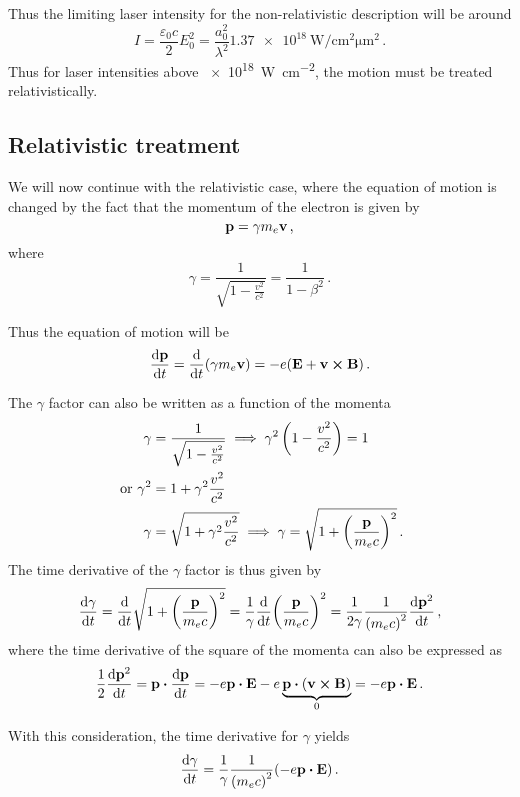 \documentclass[12pt, class=report, crop=false]{standalone}
\begin{document}
Thus the limiting laser intensity for the non-relativistic description will be around
\[
I = \frac{\varepsilon_0 c}{2} E_0^2 =
\frac{a_0^2}{\lambda^2} \SI{1.37e18}{\watt\per\centi\metre\squared\micro\metre\squared}\,.
\]
Thus for laser intensities above \SI{e18}{\watt\per\centi\metre\squared},
the motion must be treated relativistically.

\subsection{Relativistic treatment}

We will now continue with the relativistic case, where the equation
of motion is changed by the fact that the momentum of the electron is given by
\[
\vb{p} = \gamma m_e \vb{v}\,,
\]
where
\[
\gamma = \frac{1}{\sqrt{1-\frac{v^2}{c^2}}} = \frac{1}{1-\beta^2}\,.
\]

Thus the equation of motion will be
\begin{equation}
  \label{eq:relativistic-lorentz}
  \dv{\vb{p}}{t} = \dv{t}(\gamma m_e \vb{v}) = -e (\vb{E} + \vb{v}\cp\vb{B})\,.
\end{equation}

The \(\gamma\) factor can also be written as a function of the momenta
\[
\begin{aligned}
  \gamma &= \frac{1}{\sqrt{1-\frac{v^2}{c^2}}} \implies
  \gamma^2\left(1-\frac{v^2}{c^2}\right)=1\\ \text{ or }
  \gamma^2 &= 1+\gamma^2\frac{v^2}{c^2}\\
  \gamma &= \sqrt{1+\gamma^2\frac{v^2}{c^2}} \implies
  \gamma = \sqrt{1 + {\left(\frac{\vb{p}}{m_e c}\right)}^2}\,.
\end{aligned}
\]
The time derivative of the \(\gamma\) factor is thus given by
\[
\dv{\gamma}{t} = \dv{t}\sqrt{1+{\left(\frac{\vb{p}}{m_e c}\right)}^2} =
\frac{1}{\gamma} {\dv{t}} {\left(\frac{\vb{p}}{m_e c}\right)}^2 =
\frac{1}{2\gamma}\frac{1}{{(m_e c)}^2} \dv{\vb{p}^2}{t}\,,
\]
where the time derivative of the square of the momenta can also be expressed as
\[
\frac{1}{2}\dv{\vb{p}^2}{t} = \vb{p}\vdot\dv{\vb{p}}{t} =
-e\vb{p}\vdot\vb{E}-e\underbrace{\vb{p}\vdot(\vb{v}\cp\vb{B})}_0 =
-e\vb{p}\vdot\vb{E}\,.
\]

With this consideration, the time derivative for \(\gamma\) yields
\begin{equation}
  \label{eq:gamma-time-derivative}
  \dv{\gamma}{t} = \frac{1}{\gamma} \frac{1}{{(m_e c)}^2} (-e\vb{p}\vdot\vb{E})\,.
\end{equation}
\end{document}
